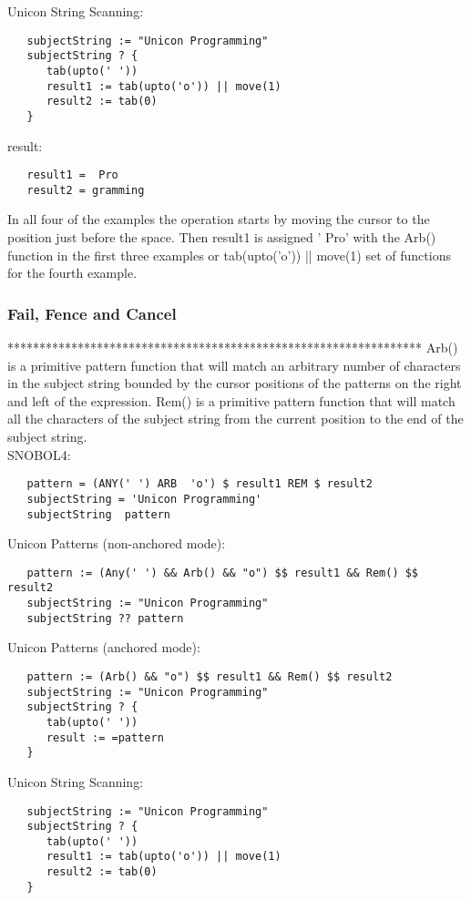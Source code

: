 \documentclass{article}
\begin{document}
\noindent
Unicon String Scanning:
\begin{verbatim}
   subjectString := "Unicon Programming"
   subjectString ? {
      tab(upto(' '))
      result1 := tab(upto('o')) || move(1)
      result2 := tab(0)
   }
\end{verbatim}

\noindent
result:
\begin{verbatim}
   result1 =  Pro
   result2 = gramming
\end{verbatim}

In all four of the examples the operation starts by moving the cursor to the position just before the space.  Then result1 is assigned ' Pro' with the Arb() function in the first three examples or tab(upto('o')) || move(1) set of functions for the fourth example.

\vspace{2 pc}
\subsubsection{Fail, Fence and Cancel}
*****************************************************************
Arb() is a primitive pattern function that will match an arbitrary number of characters in the subject string bounded by the cursor positions of the patterns on the right and left of the expression.  Rem() is a primitive pattern function that will match all the characters of the subject string from the current position to the end of the subject string.\\

\noindent
SNOBOL4:
\begin{verbatim}
   pattern = (ANY(' ') ARB  'o') $ result1 REM $ result2
   subjectString = 'Unicon Programming'
   subjectString  pattern
\end{verbatim}

\noindent
Unicon Patterns (non-anchored mode):
\begin{verbatim}
   pattern := (Any(' ') && Arb() && "o") $$ result1 && Rem() $$ result2
   subjectString := "Unicon Programming"
   subjectString ?? pattern
\end{verbatim}
\noindent
Unicon Patterns (anchored mode):
\begin{verbatim}
   pattern := (Arb() && "o") $$ result1 && Rem() $$ result2
   subjectString := "Unicon Programming"
   subjectString ? {
      tab(upto(' '))
      result := =pattern
   }
\end{verbatim}

\noindent
Unicon String Scanning:
\begin{verbatim}
   subjectString := "Unicon Programming"
   subjectString ? {
      tab(upto(' '))
      result1 := tab(upto('o')) || move(1)
      result2 := tab(0)
   }
\end{verbatim}
\end{document}
